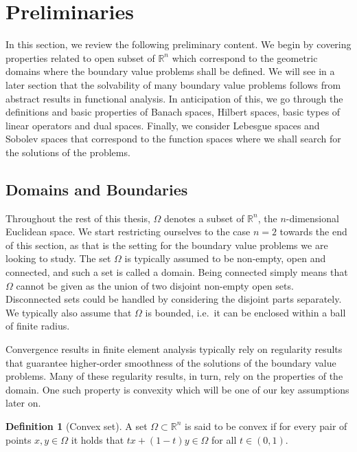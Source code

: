 \documentclass[english, 12pt, a4paper, sci, utf8, a-2b, online]{aaltothesis}
\theoremstyle{definition}
\newtheorem{definition}{Definition}[section]
\theoremstyle{plain}
\numberwithin{equation}{section}
\begin{document}
\clearpage

\section{Preliminaries}
\label{sec:preliminaries}

In this section, we review the following preliminary content.
We begin by covering properties related to open subset of $\mathbb{R}^n$
which correspond to the geometric domains where the boundary value problems shall be defined.
We will see in a later section that the solvability of many boundary value problems
follows from abstract results in functional analysis.
In anticipation of this, we go through the definitions and basic properties
of Banach spaces, Hilbert spaces, basic types of linear operators
and dual spaces. Finally, we consider Lebesgue spaces and Sobolev spaces
that correspond to the function spaces where we shall search for the solutions of
the problems.

\subsection{Domains and Boundaries}
\label{subsec:domains}

Throughout the rest of this thesis, $\Omega$ denotes a subset of $\mathbb{R}^n$,
the $n$-dimensional Euclidean space. We start restricting ourselves to the case $n=2$
towards the end of this section, as that is the setting for the boundary value problems
we are looking to study.
The set $\Omega$ is typically assumed to be non-empty, open and connected,
and such a set is called a domain.
Being connected simply means that $\Omega$ cannot be given
as the union of two disjoint non-empty open sets.
Disconnected sets could be handled by considering the
disjoint parts separately. We typically also assume that $\Omega$ is bounded,
i.e.\ it can be enclosed within a ball of finite radius.

Convergence results in finite element analysis typically rely on regularity 
results that guarantee higher-order smoothness of the solutions of the boundary
value problems. Many of these regularity results, in turn, rely on the 
properties of the domain. One such property is convexity which will be one 
of our key assumptions later on.
\begin{definition}[Convex set]
    \label{def:convexity}
    A set $\Omega \subset \mathbb{R}^n$ is said to be convex if for every
    pair of points $x,y \in \Omega$ it holds that $tx + (1-t)y \in \Omega$
    for all $t \in (0,1)$.
\end{definition}
\end{document}
